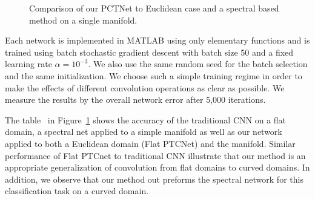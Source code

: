 \documentclass[10pt,twocolumn,letterpaper]{article}
\begin{document}
\begin{figure}[htp]
\begin{center}
\end{center}
\caption{Comparison of our PCTNet to Euclidean case and a spectral based method on a single manifold.}
\label{tab:SingleMNIST}
\end{figure}

Each network is implemented in MATLAB using only elementary functions and  is trained using batch stochastic gradient descent with batch size 50 and a fixed learning rate $\alpha = 10^{-3}$. We also use the same random seed for the batch selection and the same initialization. We choose such a simple training regime in order to make the effects of different convolution operations as clear as possible. We measure the results by the overall network error after 5,000 iterations.

The table~ in Figure~\ref{tab:SingleMNIST} shows the accuracy of the traditional CNN on a flat domain, a spectral net applied to a simple manifold as well as our network applied to both a Euclidean domain (Flat PTCNet) and the manifold. Similar performance of Flat PTCnet to traditional CNN illustrate that our method is an appropriate generalization of convolution from flat domains to curved domains. In addition, we observe that our method out preforms the spectral network for this classification task on a curved domain.
\end{document}
